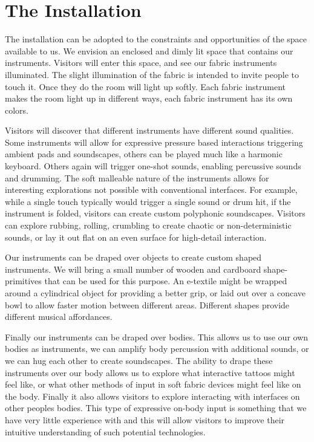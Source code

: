 \documentclass{sigchi-ext}
\begin{document}
\section{The Installation}
The installation can be adopted to the constraints and opportunities of the space available to us. We envision an enclosed and dimly lit space that contains our instruments. Visitors will enter this space, and see our fabric instruments illuminated. The slight illumination of the fabric is intended to invite people to touch it. Once they do the room will light up softly. Each fabric instrument makes the room light up in different ways, each fabric instrument has its own colors.

Visitors will discover that different instruments have different sound qualities. Some instruments will allow for expressive pressure based interactions triggering ambient pads and soundscapes, others can be played much like a harmonic keyboard. Others again will trigger one-shot sounds, enabling percussive sounds and drumming. The soft malleable nature of the instruments allows for interesting explorations not possible with conventional interfaces. For example, while a single touch typically would trigger a single sound or drum hit, if the instrument is folded, visitors can create custom polyphonic soundscapes. Visitors can explore rubbing, rolling, crumbling to create chaotic or non-deterministic sounds, or lay it out flat on an even surface for high-detail interaction.

Our instruments can be draped over objects to create custom shaped instruments. We will bring a small number of wooden and cardboard shape-primitives that can be used for this purpose. An e-textile might be wrapped around a cylindrical object for providing a better grip, or laid out over a concave bowl to allow faster motion between different areas. Different shapes provide different musical affordances.

Finally our instruments can be draped over bodies. This allows us to use our own bodies as instruments, we can amplify body percussion with additional sounds, or we can hug each other to create soundscapes. The ability to drape these instruments over our body allows us to explore what interactive tattoos might feel like, or what other methods of input in soft fabric devices might feel like on the body. Finally it also allows visitors to explore interacting with interfaces on other peoples bodies. This type of expressive on-body input is something that we have very little experience with and this will allow visitors to improve their intuitive understanding of such potential technologies.
\end{document}
